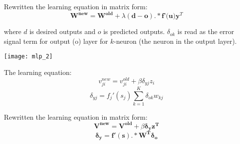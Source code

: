 \begin{multicols*}{2}
\noindent Rewritten the learning equation in matrix form:
$$\mathbf{W^{new}} = \mathbf{W^{old}} + \lambda (\mathbf{d}-\mathbf{o}).* \textbf{f'(u)} \mathbf{y}^T$$

\noindent where $d$ is desired outputs and $o$ is predicted outputs. $\delta_{ok}$ is read as the error signal term for output (o) layer for $k$-neuron (the neuron in the output layer). 

\begin{center}
\texttt{[image: mlp\_2]}
\end{center}

\noindent The learning equation:
$$v_{ji}^{new} = v_{ji}^{old} + \beta \delta_{yj} z_i$$
$$\delta_{yj} = f_j'(s_j)\sum_{k=1}^{K} \delta_{ok} w_{kj}$$

\noindent Rewritten the learning equation in matrix form:
$$\mathbf{V^{new} = V^{old}} + \beta \mathbf{\delta_y z^{T}}$$
$$\mathbf{\delta_y = f'(s) .* W^{T} \delta_o}$$

\end{multicols*}
